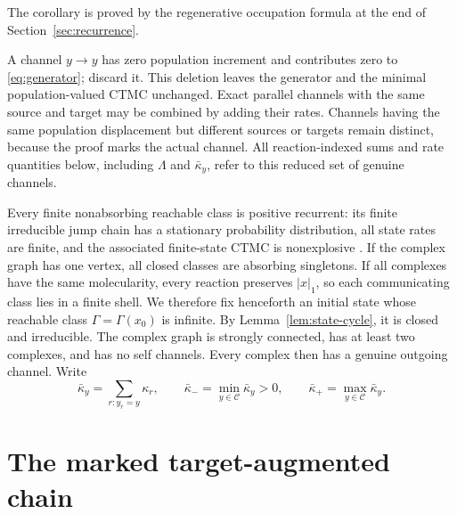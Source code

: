 The corollary is proved by the regenerative occupation formula at the end of
Section~\ref{sec:recurrence}.

A channel \(y\to y\) has zero population increment and contributes zero to
\eqref{eq:generator}; discard it.  This deletion leaves the generator and the
minimal population-valued CTMC unchanged.  Exact parallel channels with the same
source and target may be combined by adding their rates.  Channels having the
same population displacement but different sources or targets remain
distinct, because the proof marks the actual channel.
All reaction-indexed sums and rate quantities below, including \(\Lambda\)
and \(\bar\kappa_y\), refer to this reduced set of genuine channels.

Every finite nonabsorbing reachable class is positive recurrent:
its finite irreducible jump chain has a stationary probability distribution,
all state rates are finite, and the associated finite-state CTMC is
nonexplosive \citep{Norris1997}.  If
the complex graph has one vertex, all closed classes are absorbing
singletons.  If all complexes have the same molecularity, every reaction
preserves \(|x|_1\), so each communicating class lies in a finite shell.  We
therefore fix henceforth an initial state whose reachable class
\(\Gamma=\Gamma(x_0)\) is infinite.  By
Lemma~\ref{lem:state-cycle}, it is closed and irreducible.  The complex graph
is strongly connected, has at least two complexes, and has no self channels.
Every complex then has a genuine outgoing channel.  Write
\begin{equation}\label{eq:kbar}
  \bar\kappa_y=\sum_{r:y_r=y}\kappa_r,
  \qquad
  \bar\kappa_- =\min_{y\in\mathcal C}\bar\kappa_y>0,
  \qquad
  \bar\kappa_+ =\max_{y\in\mathcal C}\bar\kappa_y.
\end{equation}

\section{The marked target-augmented chain}\label{sec:marked}

